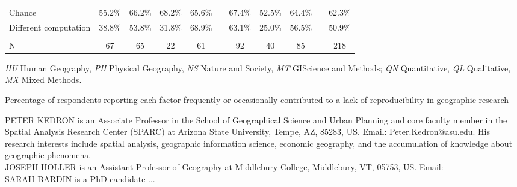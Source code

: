\documentclass[]{interact}
\theoremstyle{plain}%
\theoremstyle{definition}
\theoremstyle{remark}
\begin{document}
\begin{table}[h]
\begin{threeparttable}
\begin{tabular}{l c c c c c c c c c c}
         Chance                             & 55.2\% & 66.2\% & 68.2\% & 65.6\% & & 67.4\% & 52.5\% & 64.4\% & & 62.3\% \\
         Different computation              & 38.8\% & 53.8\% & 31.8\% & 68.9\% & & 63.1\% & 25.0\% & 56.5\% & & 50.9\% \\
                                            & & & & & & & & & &\\
         N                                  & 67 & 65 & 22 & 61 & & 92 & 40 & 85 & & 218 \\
        \hline
    \end{tabular}
    \begin{tablenotes}
        \footnotesize
        \item \textit{HU} Human Geography, \textit{PH} Physical Geography, \textit{NS} Nature and Society, \textit{MT} GIScience and Methods; \textit{QN} Quantitative, \textit{QL} Qualitative, \textit{MX} Mixed Methods. 
        \item Percentage of respondents reporting each factor frequently or occasionally contributed to a lack of reproducibility in geographic research
    \end{tablenotes}
    \label{tab:barriers}
    \end{threeparttable}
\end{table}
\newpage
\noindent PETER KEDRON is an Associate Professor in the School of Geographical Science and Urban Planning and core faculty member in the Spatial Analysis Research Center (SPARC) at Arizona State University, Tempe, AZ, 85283, US. Email: Peter.Kedron@asu.edu. His research interests include spatial analysis, geographic information science, economic geography, and the accumulation of knowledge about geographic phenomena. \\  
  
\noindent JOSEPH HOLLER is an Assistant Professor of Geography at Middlebury College, Middlebury, VT, 05753, US. Email: \\
  
\noindent SARAH BARDIN is a PhD candidate ...
\end{document}
